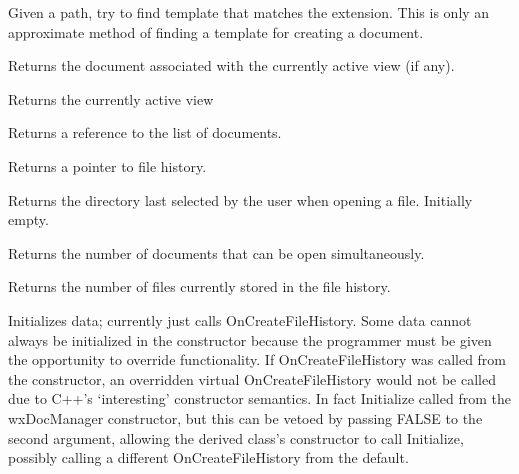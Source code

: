 
Given a path, try to find template that matches the extension. This is only
an approximate method of finding a template for creating a document.



Returns the document associated with the currently active view (if any).



Returns the currently active view 



Returns a reference to the list of documents.



Returns a pointer to file history.

\label{wxdocmanagergetlastdirectory}


Returns the directory last selected by the user when opening a file. Initially empty.



Returns the number of documents that can be open simultaneously.



Returns the number of files currently stored in the file history.

\label{wxdocmanagerinitialize}


Initializes data; currently just calls OnCreateFileHistory. Some data cannot
always be initialized in the constructor because the programmer must be given
the opportunity to override functionality. If OnCreateFileHistory was called
from the constructor, an overridden virtual OnCreateFileHistory would not be
called due to C++'s `interesting' constructor semantics. In fact Initialize
 called from the wxDocManager constructor, but this can be
vetoed by passing FALSE to the second argument, allowing the derived class's
constructor to call Initialize, possibly calling a different OnCreateFileHistory
from the default.

